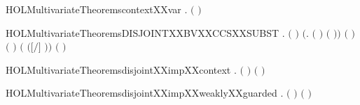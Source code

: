 \begin{SaveVerbatim}{HOLMultivariateTheoremscontextXXvar}
\HOLTokenTurnstile{} \HOLSymConst{\HOLTokenForall{}} .   \ensuremath{(} \ensuremath{)}
\end{SaveVerbatim}
\newcommand{\HOLMultivariateTheoremscontextXXvar}{\UseVerbatim{HOLMultivariateTheoremscontextXXvar}}
\begin{SaveVerbatim}{HOLMultivariateTheoremsDISJOINTXXBVXXCCSXXSUBST}
\HOLTokenTurnstile{} \HOLSymConst{\HOLTokenForall{}}  .
         \HOLSymConst{\HOLTokenConj{}} \ensuremath{(}  \HOLSymConst{\ensuremath{=}}  \ensuremath{)} \HOLSymConst{\HOLTokenConj{}}
        \ensuremath{(}\HOLTokenLambda{}.  \ensuremath{(} \ensuremath{)} \ensuremath{(} \ensuremath{)}\ensuremath{)}  \HOLSymConst{\HOLTokenConj{}}
        \ensuremath{(} \ensuremath{)} \ensuremath{(} \ensuremath{)} \HOLSymConst{\HOLTokenImp{}}
        \ensuremath{(} \ensuremath{(}\ensuremath{[}\ensuremath{/}\ensuremath{]} \ensuremath{)}\ensuremath{)} \ensuremath{(} \ensuremath{)}
\end{SaveVerbatim}
\newcommand{\HOLMultivariateTheoremsDISJOINTXXBVXXCCSXXSUBST}{\UseVerbatim{HOLMultivariateTheoremsDISJOINTXXBVXXCCSXXSUBST}}
\begin{SaveVerbatim}{HOLMultivariateTheoremsdisjointXXimpXXcontext}
\HOLTokenTurnstile{} \HOLSymConst{\HOLTokenForall{}} .  \ensuremath{(} \ensuremath{)} \ensuremath{(} \ensuremath{)} \HOLSymConst{\HOLTokenImp{}}   
\end{SaveVerbatim}
\newcommand{\HOLMultivariateTheoremsdisjointXXimpXXcontext}{\UseVerbatim{HOLMultivariateTheoremsdisjointXXimpXXcontext}}
\begin{SaveVerbatim}{HOLMultivariateTheoremsdisjointXXimpXXweaklyXXguarded}
\HOLTokenTurnstile{} \HOLSymConst{\HOLTokenForall{}} .  \ensuremath{(} \ensuremath{)} \ensuremath{(} \ensuremath{)} \HOLSymConst{\HOLTokenImp{}}   
\end{SaveVerbatim}
